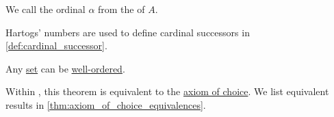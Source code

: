 \begin{definition}\label{def:hartogs_number}
  We call the ordinal \( \alpha \) from  the  of \( A \).
\end{definition}
\begin{comments}
  \item Hartogs' numbers are used to define cardinal successors in \cref{def:cardinal_successor}.
\end{comments}

\begin{theorem}\label{thm:well_ordering_theorem}
  Any \hyperref[def:set]{set} can be \hyperref[def:well_ordered_set]{well-ordered}.
\end{theorem}
\begin{comments}
  \item Within \hyperref[def:zfc]{}, this theorem is equivalent to the \hyperref[def:zfc/choice]{axiom of choice}. We list equivalent results in \cref{thm:axiom_of_choice_equivalences}.
\end{comments}
